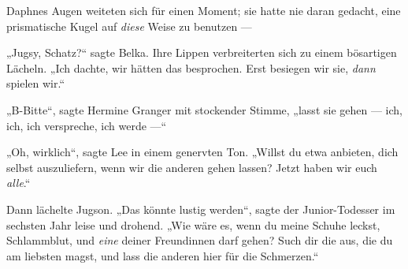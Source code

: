 Daphnes Augen weiteten sich für einen Moment; sie hatte nie daran gedacht, eine prismatische Kugel auf \emph{diese} Weise zu benutzen —

„Jugsy, Schatz?“ sagte Belka. Ihre Lippen verbreiterten sich zu einem bösartigen Lächeln.
„Ich dachte, wir hätten das besprochen. Erst besiegen wir sie, \emph{dann} spielen wir.“

„B-Bitte“, sagte Hermine Granger mit stockender Stimme, „lasst sie gehen — ich, ich, ich verspreche, ich werde —“

„Oh, wirklich“, sagte Lee in einem genervten Ton.
„Willst du etwa anbieten, dich selbst auszuliefern, wenn wir die anderen gehen lassen? Jetzt haben wir euch \emph{alle}.“

Dann lächelte Jugson.
„Das könnte lustig werden“, sagte der Junior-Todesser im sechsten Jahr leise und drohend.
„Wie wäre es, wenn du meine Schuhe leckst, Schlammblut, und \emph{eine} deiner Freundinnen darf gehen? Such dir die aus, die du am liebsten magst, und lass die anderen hier für die Schmerzen.“

